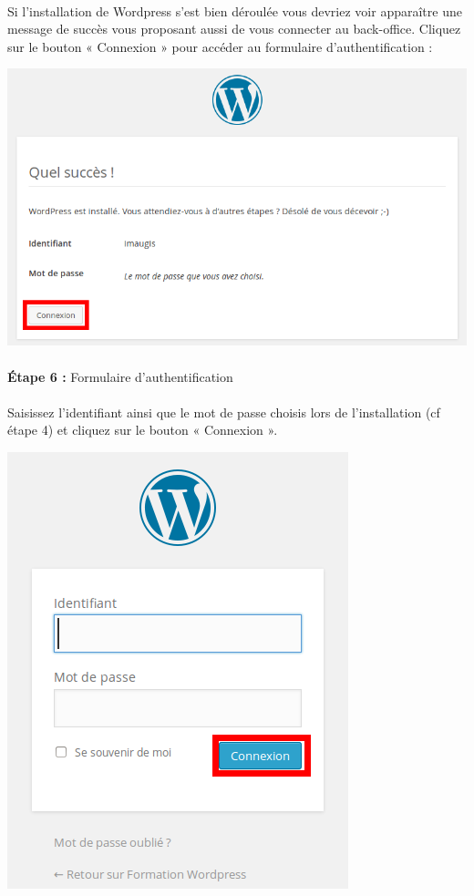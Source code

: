 \documentclass[10pt,a4paper]{article}
\begin{document}
\paragraph{}Si l'installation de Wordpress s'est bien déroulée vous devriez voir apparaître une message de succès vous proposant aussi de vous connecter au back-office. Cliquez sur le bouton « Connexion » pour accéder au formulaire d'authentification :
\begin{center}
\includegraphics[scale=0.5]{img/0044.png}
\end{center}
\paragraph{}\textbf{Étape 6 : }Formulaire d'authentification
\paragraph{}Saisissez l'identifiant ainsi que le mot de passe choisis lors de l'installation (cf étape 4) et cliquez sur le bouton « Connexion ».
\begin{center}
\includegraphics[scale=0.5]{img/0045.png}
\end{center}
\end{document}
